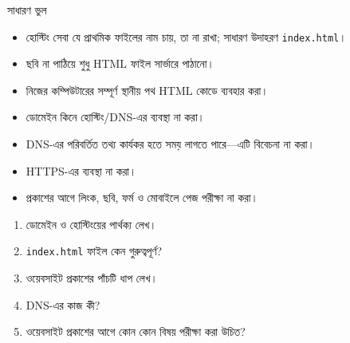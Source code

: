\begin{mistakebox}{সাধারণ ভুল}
\par\noindent
\begin{minipage}[t]{.48\linewidth}\vspace{0pt}
\begin{itemize}
\item হোস্টিং সেবা যে প্রাথমিক ফাইলের নাম চায়, তা না রাখা; সাধারণ উদাহরণ \texttt{index.html}।
\item ছবি না পাঠিয়ে শুধু HTML ফাইল সার্ভারে পাঠানো।
\item নিজের কম্পিউটারের সম্পূর্ণ স্থানীয় পথ HTML কোডে ব্যবহার করা।
\item ডোমেইন কিনে হোস্টিং/DNS-এর ব্যবস্থা না করা।
\end{itemize}
\end{minipage}\hfill
\begin{minipage}[t]{.48\linewidth}\vspace{0pt}
\begin{itemize}
\item DNS-এর পরিবর্তিত তথ্য কার্যকর হতে সময় লাগতে পারে—এটি বিবেচনা না করা।
\item HTTPS-এর ব্যবস্থা না করা।
\item প্রকাশের আগে লিংক, ছবি, ফর্ম ও মোবাইলে পেজ পরীক্ষা না করা।
\end{itemize}
\end{minipage}\par

\end{mistakebox}

\begin{practicebox}
\begin{enumerate}
\item ডোমেইন ও হোস্টিংয়ের পার্থক্য লেখ।
\item \texttt{index.html} ফাইল কেন গুরুত্বপূর্ণ?
\item ওয়েবসাইট প্রকাশের পাঁচটি ধাপ লেখ।
\item DNS-এর কাজ কী?
\item ওয়েবসাইট প্রকাশের আগে কোন কোন বিষয় পরীক্ষা করা উচিত?
\end{enumerate}
\end{practicebox}
